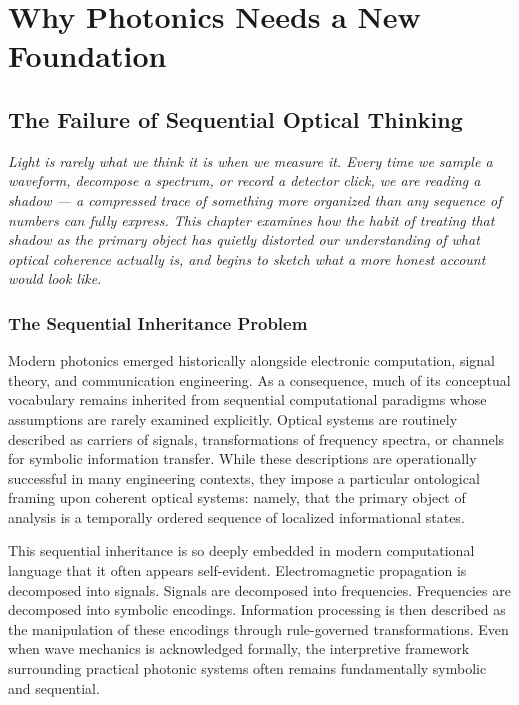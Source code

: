 \documentclass[11pt,openany]{book}
\theoremstyle{definition}
\theoremstyle{plain}
\begin{document}
\mainmatter


\part{Why Photonics Needs a New Foundation}


\chapter{The Failure of Sequential Optical Thinking}

\noindent\textit{Light is rarely what we think it is when we measure it. Every time we sample a waveform, decompose a spectrum, or record a detector click, we are reading a shadow --- a compressed trace of something more organized than any sequence of numbers can fully express. This chapter examines how the habit of treating that shadow as the primary object has quietly distorted our understanding of what optical coherence actually is, and begins to sketch what a more honest account would look like.}

\bigskip

\section{The Sequential Inheritance Problem}

Modern photonics emerged historically alongside electronic computation, signal theory, and communication engineering. As a consequence, much of its conceptual vocabulary remains inherited from sequential computational paradigms whose assumptions are rarely examined explicitly. Optical systems are routinely described as carriers of signals, transformations of frequency spectra, or channels for symbolic information transfer. While these descriptions are operationally successful in many engineering contexts, they impose a particular ontological framing upon coherent optical systems: namely, that the primary object of analysis is a temporally ordered sequence of localized informational states.

This sequential inheritance is so deeply embedded in modern computational language that it often appears self-evident. Electromagnetic propagation is decomposed into signals. Signals are decomposed into frequencies. Frequencies are decomposed into symbolic encodings. Information processing is then described as the manipulation of these encodings through rule-governed transformations. Even when wave mechanics is acknowledged formally, the interpretive framework surrounding practical photonic systems often remains fundamentally symbolic and sequential.
\end{document}
